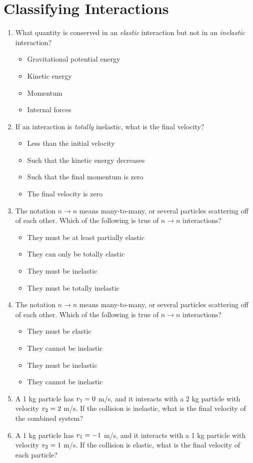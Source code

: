 \documentclass[10pt]{article}
\begin{document}
\section{Classifying Interactions}
\begin{enumerate}
\item What quantity is conserved in an \textit{elastic} interaction but not in an \textit{inelastic} interaction?
\begin{itemize}
\item Gravitational potential energy
\item Kinetic energy
\item Momentum
\item Internal forces
\end{itemize}
\item If an interaction is \textit{totally} inelastic, what is the final velocity?
\begin{itemize}
\item Less than the initial velocity
\item Such that the kinetic energy decreases
\item Such that the final momentum is zero
\item The final velocity is zero
\end{itemize}
\item The notation $n \rightarrow n$ means many-to-many, or several particles scattering off of each other.  Which of the following is true of $n \rightarrow n$ interactions?
\begin{itemize}
\item They must be at least partially elastic
\item They can only be totally elastic
\item They must be inelastic
\item They must be totally inelastic
\end{itemize}
\item The notation $n \rightarrow n$ means many-to-many, or several particles scattering off of each other.  Which of the following is true of $n \rightarrow n$ interactions?
\begin{itemize}
\item They must be elastic
\item They cannot be inelastic
\item They must be inelastic
\item They cannot be inelastic
\end{itemize}
\item A 1 kg particle has $v_{\rm 1} = 0$ m/s, and it interacts with a 2 kg particle with velocity $v_{\rm 2} = 2$ m/s.  If the collision is inelastic, what is the final velocity of the combined system? \\ \vspace{1.5cm}
\item A 1 kg particle has $v_{\rm 1} = -1$ m/s, and it interacts with a 1 kg particle with velocity $v_{\rm 2} = 1$ m/s.  If the collision is elastic, what is the final velocity of each particle? \\ \vspace{1.5 cm}
\end{enumerate}
\end{document}
